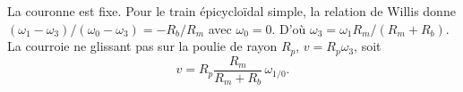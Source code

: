 \begin{corrigebox}
La couronne est fixe. Pour le train épicycloïdal simple,
            la relation de Willis donne
            $(\omega_1-\omega_3)/(\omega_0-\omega_3)=-R_b/R_m$ avec $\omega_0=0$.
            D'où $\omega_3=\omega_1R_m/(R_m+R_b)$. La courroie ne glissant pas sur la
            poulie de rayon $R_p$, $v=R_p\omega_3$, soit
            \[\boxed{v=R_p\frac{R_m}{R_m+R_b}\,\omega_{1/0}}.\]
\end{corrigebox}
